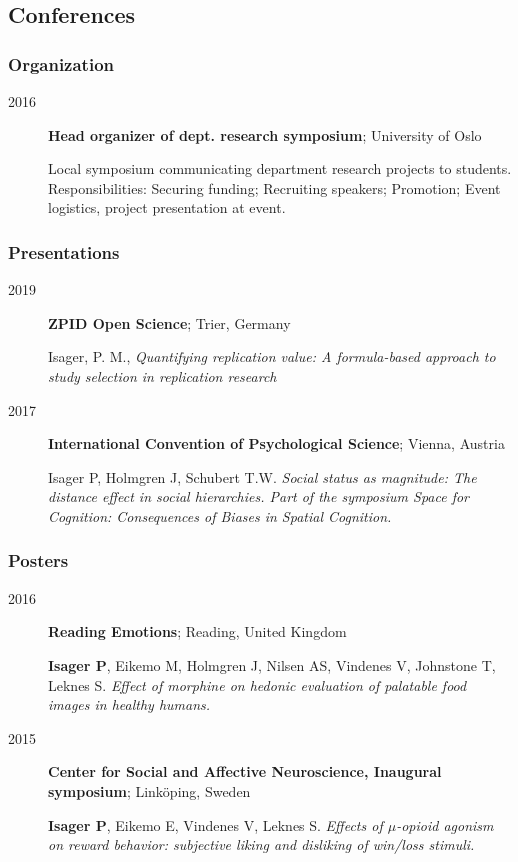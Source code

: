 \documentclass[]{article}
\begin{document}
\subsection{Conferences}\label{conferences}

\subsubsection{Organization}\label{organization}

\begin{description}
\item[2016]
\textbf{Head organizer of dept. research symposium}; University of Oslo

Local symposium communicating department research projects to students.
Responsibilities: Securing funding; Recruiting speakers; Promotion;
Event logistics, project presentation at event.
\end{description}

\subsubsection{Presentations}\label{presentations}

\begin{description}
\item[2019]
\textbf{ZPID Open Science}; Trier, Germany

Isager, P. M., \emph{Quantifying replication value: A formula-based
approach to study selection in replication research}
\item[2017]
\textbf{International Convention of Psychological Science}; Vienna,
Austria

Isager P, Holmgren J, Schubert T.W. \emph{Social status as magnitude:
The distance effect in social hierarchies. Part of the symposium Space
for Cognition: Consequences of Biases in Spatial Cognition.}
\end{description}

\subsubsection{Posters}\label{posters}

\begin{description}
\item[2016]
\textbf{Reading Emotions}; Reading, United Kingdom

\textbf{Isager P}, Eikemo M, Holmgren J, Nilsen AS, Vindenes V,
Johnstone T, Leknes S. \emph{Effect of morphine on hedonic evaluation of
palatable food images in healthy humans.}
\item[2015]
\textbf{Center for Social and Affective Neuroscience, Inaugural
symposium}; Linköping, Sweden

\textbf{Isager P}, Eikemo E, Vindenes V, Leknes S. \emph{Effects of
\(\mu\)-opioid agonism on reward behavior: subjective liking and
disliking of win/loss stimuli.}
\end{description}
\end{document}
